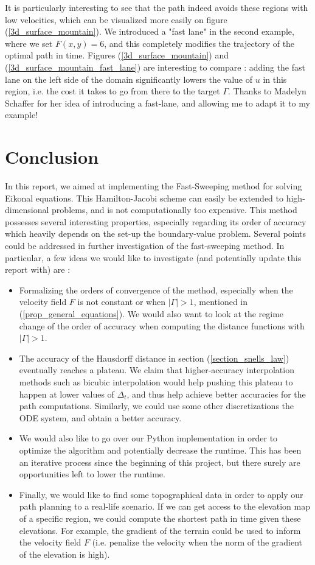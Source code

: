 \documentclass[11pt]{article}
\theoremstyle{definition}
\theoremstyle{remark}
\begin{document}
\noindent It is particularly interesting to see that the path indeed avoids these regions with low velocities, which can be visualized more easily on figure (\ref{3d_surface_mountain}). We introduced a "fast lane" in the second example, where we set $F(x,y)=6$, and this completely modifies the trajectory of the optimal path in time. Figures (\ref{3d_surface_mountain}) and (\ref{3d_surface_mountain_fast_lane}) are interesting to compare : adding the fast lane on the left side of the domain significantly lowers the value of $u$ in this region, i.e. the cost it takes to go from there to the target $\Gamma$.
Thanks to Madelyn Schaffer for her idea of introducing a fast-lane, and allowing me to adapt it to my example!
\section{Conclusion}
In this report, we aimed at implementing the Fast-Sweeping method for solving Eikonal equations. This Hamilton-Jacobi scheme can easily be extended to high-dimensional problems, and is not computationally too expensive. This method possesses several interesting properties, especially regarding its order of accuracy which heavily depends on the set-up the boundary-value problem. Several points could be addressed in further investigation of the fast-sweeping method. In particular, a few ideas we would like to investigate (and potentially update this report with) are :
\begin{itemize}
    \item Formalizing the orders of convergence of the method, especially when the velocity field $F$ is not constant or when $|\Gamma|>1$, mentioned in (\ref{prop_general_equations}). We would also want to look at the regime change of the order of accuracy when computing the distance functions with $|\Gamma|>1$.
    \item The accuracy of the Hausdorff distance in section (\ref{section_snells_law}) eventually reaches a plateau. We claim that higher-accuracy interpolation methods such as bicubic interpolation would help pushing this plateau to happen at lower values of $\Delta_t$, and thus help achieve better accuracies for the path computations. Similarly, we could use some other discretizations the ODE system, and obtain a better accuracy.
    \item We would also like to go over our Python implementation in order to optimize the algorithm and potentially decrease the runtime. This has been an iterative process since the beginning of this project, but there surely are opportunities left to lower the runtime.
    \item Finally, we would like to find some topographical data in order to apply our path planning to a real-life scenario. If we can get access to the elevation map of a specific region, we could compute the shortest path in time given these elevations. For example, the gradient of the terrain could be used to inform the velocity field $F$ (i.e. penalize the velocity when the norm of the gradient of the elevation is high).
\end{itemize}
\end{document}
